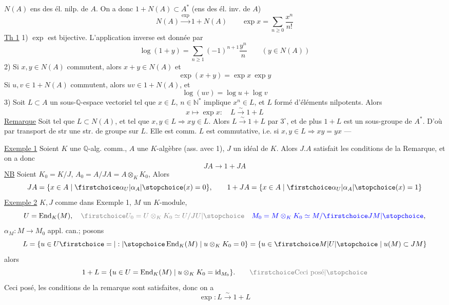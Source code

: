 $N(A)$ ens des él. nilp. de $A$. On a donc $1+N(A)\subset A^*$ (ens des él. inv. de $A$)
\[
N(A)\xrightarrow{\exp}1+N(A)\qquad\exp x=\sum_{n\geq0}\frac{x^n}{n!}
\]
\uline{Th 1} 1) $\exp$ est bijective. L'application inverse est donnée par
\[
\log(1+y)=\sum_{n\geq1}(-1)^{n+1}\frac{y^n}{n}\qquad(y\in N(A))
\]
2) Si $x,y\in N(A)$ commutent, alors $x+y\in N(A)$ et
\[
\exp(x+y)=\exp x\ \exp y
\]
Si $u,v\in1+N(A)$ commutent, alors $uv\in1+N(A)$, et
\[
\log(uv)=\log u+\log v
\]
3) Soit $L\subset A$ un sous-$\mathbb{Q}$-espace vectoriel tel que $x\in L$, $n\in\mathbb{N}^*$ implique $x^n\in L$,  et $L$ formé d'éléments nilpotents. Alors
\[
x\longmapsto\exp x:\quad L\xrightarrow{\sim}1+L
\]
\uline{Remarque} Soit   tel que $L\subset N(A)$, et tel que $x,y\in L\Rightarrow xy\in L$. Alors $L\xrightarrow{\sim}1+L$ par $3^\circ$, et de plus $1+L$ est un sous-groupe de $A^*$. D'où par transport de str une str. de groupe sur $L$. Elle est comm.  $L$ est commutative, i.e. si $x,y\in L\Rightarrow xy=yx$ --- 

\uline{Exemple 1} Soient $K$ une $\mathbb{Q}$-alg. comm., $A$ une $K$-algèbre (ass. avec 1), $J$ un   idéal de $K$. Alors $J.A$ satisfait les conditions de la Remarque, et on a donc
\[
JA\longrightarrow1+JA
\]
\uline{NB} Soient $K_0=K/J$, $A_0=A/JA=A\otimes_KK_0$,  Alors 
\[
JA=\{x\in A\mid\unsure{\alpha_U|\alpha_A}(x)=0\},\qquad1+JA=\{x\in A\mid\unsure{\alpha_U|\alpha_A}(x)=1\}
\]
\uline{Exemple 2} $K,J$ comme dans Exemple 1,  $M$ un $K$-module,
\[
U=\operatorname{End}_K(M),\quad
\deleted{\unsure{U_0=U\otimes_KK_0\simeq U/JU}}\quad
\inserted{M_0=M\otimes_KK_0\simeq M/\unsure{JM}},
\]
$\alpha_M:M\longrightarrow M_0$ appl. can.; posons
\[
L=\{u\in U\unsure{=|:}\operatorname{End}_K(M)\mid u\otimes_KK_0=0\}
=\{u\in\unsure{M|U}\mid u(M)\subset JM\}
\]
alors
\[
1+L=\{u\in U=\operatorname{End}_K(M)\mid u\otimes_KK_0=\operatorname{id}_{M_0}\}.
\qquad\deleted{\unsure{\text{Ceci posé}}}
\]
Ceci posé, les conditions de la remarque sont satisfaites, donc on a
\[
\exp:L\xrightarrow{\sim}1+L
\]

